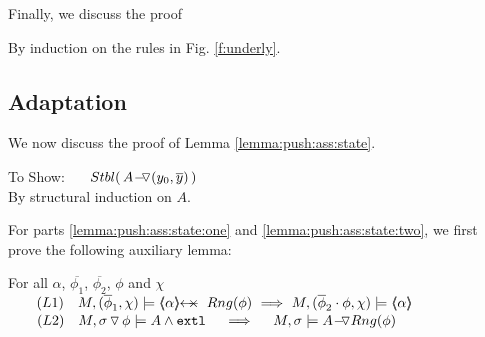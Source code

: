 \vspace{1cm} Finally, we discuss the proof


\newcommand{\SP}{$\strut \ \ \ \ $}

By induction on the rules in Fig. \ref{f:underly}.

\completeProof 

\subsection{Adaptation}
\label{appendix:adaptation}
 
 
 We now discuss the proof of Lemma \ref{lemma:push:ass:state}.

 \vspace{0.5cm}
 
$~$ \\
To Show: \ \ \  $\Stable{\,  \PushASLong {(y_0,\overline y)} A\, }$
\\
By structural induction on $A$.\\
\completeProofSub

\vspace{1cm}

For parts \ref{lemma:push:ass:state:one} and \ref{lemma:push:ass:state:two}, we first prove the following auxiliary lemma:

\begin{auxLemma}
\label{l:push:pop:aux}
For all $\alpha$,   $\overline {\phi_1}$, $\overline {\phi_2}$, $\phi$ and $\chi$\\
$\strut ~ \ \ \ \ \ (L1)\ \ \    M, (\overline \phi_1,\chi) \models \protectedFrom \alpha {Rng(\phi)} \ \Longrightarrow \ M, (\overline \phi_2\cdot \phi,\chi) \models \inside \alpha$
\\
$\strut ~ \ \ \ \ \ (L2)\ \ \    M,  \PushSLong {\phi} {\sigma}   \models  A  \wedge \extThis    \ \  \ \  \Longrightarrow  \ \ \ \ M, \sigma \models \PushASLong  {Rng(\phi)} {A}$
\end{auxLemma}


